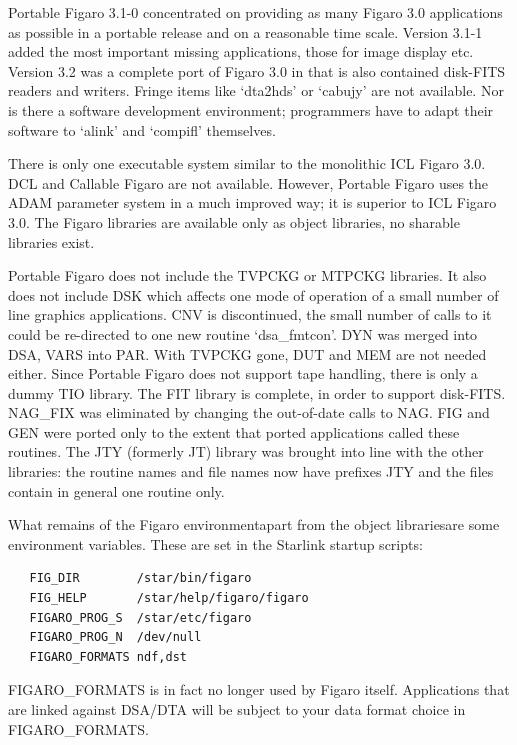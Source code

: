    Portable Figaro 3.1-0 concentrated on providing as many Figaro 3.0
   applications as possible in a portable release and on a reasonable
   time scale.  Version 3.1-1 added the most important missing
   applications, those for image display etc.  Version 3.2 was a complete
   port of Figaro 3.0 in that is also contained disk-FITS readers and
   writers.  Fringe items like `dta2hds' or `cabujy' are not available.
   Nor is there a software development environment; programmers have to
   adapt their software to `alink' and `compifl' themselves.

   There is only one executable system similar to the monolithic ICL
   Figaro 3.0. DCL and Callable Figaro are not available.  However,
   Portable Figaro uses the ADAM parameter system in a much improved
   way; it is superior to ICL Figaro 3.0. The Figaro libraries are
   available only as object libraries, no sharable libraries exist.

   Portable Figaro does not include the TVPCKG or MTPCKG libraries.  It also
   does not include DSK which affects one mode of operation of a small
   number of line graphics applications. CNV is discontinued, the small
   number of calls to it could be re-directed to one new routine
   `dsa\_fmtcon'. DYN was merged into DSA, VARS into PAR. With TVPCKG gone,
   DUT and MEM are not needed either.  Since Portable Figaro does not
   support tape handling, there is only a dummy TIO library. The FIT
   library is complete, in order to support disk-FITS.  NAG\_FIX was
   eliminated by changing the out-of-date calls to NAG. FIG and GEN were
   ported only to the extent that ported applications called these
   routines. The JTY (formerly JT) library was brought into line with
   the other libraries: the routine names and file names now have
   prefixes JTY and the files contain in general one routine only.

   What remains of the Figaro environment\latorhtm{---}{-}apart from the
   object libraries\latorhtm{---}{-}are some environment variables. These
   are set in the Starlink startup scripts:

\begin{verbatim}
   FIG_DIR        /star/bin/figaro
   FIG_HELP       /star/help/figaro/figaro
   FIGARO_PROG_S  /star/etc/figaro
   FIGARO_PROG_N  /dev/null
   FIGARO_FORMATS ndf,dst
\end{verbatim}

   FIGARO\_FORMATS is in fact no longer used by Figaro itself.
   Applications that are linked against DSA/DTA will be subject to
   your data format choice in FIGARO\_FORMATS.

